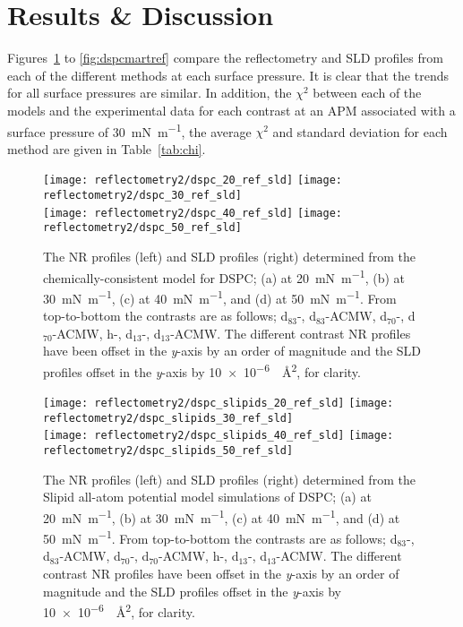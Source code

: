 \section{Results \& Discussion}
Figures~\ref{fig:dspcccref} to \ref{fig:dspcmartref} compare the reflectometry and SLD profiles from each of the different methods at each surface pressure.
It is clear that the trends for all surface pressures are similar.
In addition, the $\chi^2$ between each of the models and the experimental data for each contrast at an APM associated with a surface pressure of \SI{30}{\milli\newton\per\meter}, the average $\chi^2$ and standard deviation for each method are given in Table~\ref{tab:chi}.
%
\begin{figure}
    \centering
    \texttt{[image: reflectometry2/dspc\_20\_ref\_sld]}
    \texttt{[image: reflectometry2/dspc\_30\_ref\_sld]}\\
    \texttt{[image: reflectometry2/dspc\_40\_ref\_sld]}
    \texttt{[image: reflectometry2/dspc\_50\_ref\_sld]}
    \caption{The NR profiles (left) and SLD profiles (right) determined from the chemically-consistent model for DSPC; (a) at \SI{20}{\milli\newton\per\meter}, (b) at \SI{30}{\milli\newton\per\meter}, (c) at \SI{40}{\milli\newton\per\meter}, and (d) at \SI{50}{\milli\newton\per\meter}. From top-to-bottom the contrasts are as follows; d$_{83}$-, d$_{83}$-ACMW, d$_{70}$-, d$_{70}$-ACMW, h-, d$_{13}$-, d$_{13}$-ACMW. The different contrast NR profiles have been offset in the \emph{y}-axis by an order of magnitude and the SLD profiles offset in the \emph{y}-axis by \SI{10e-6}{\per\angstrom\squared}, for clarity.}
    \label{fig:dspcccref}
\end{figure}
%
%
\begin{figure}
    \centering
    \texttt{[image: reflectometry2/dspc\_slipids\_20\_ref\_sld]}
    \texttt{[image: reflectometry2/dspc\_slipids\_30\_ref\_sld]}\\
    \texttt{[image: reflectometry2/dspc\_slipids\_40\_ref\_sld]}
    \texttt{[image: reflectometry2/dspc\_slipids\_50\_ref\_sld]}
    \caption{The NR profiles (left) and SLD profiles (right) determined from the Slipid all-atom potential model simulations of DSPC; (a) at \SI{20}{\milli\newton\per\meter}, (b) at \SI{30}{\milli\newton\per\meter}, (c) at \SI{40}{\milli\newton\per\meter}, and (d) at \SI{50}{\milli\newton\per\meter}. From top-to-bottom the contrasts are as follows; d$_{83}$-, d$_{83}$-ACMW, d$_{70}$-, d$_{70}$-ACMW, h-, d$_{13}$-, d$_{13}$-ACMW. The different contrast NR profiles have been offset in the \emph{y}-axis by an order of magnitude and the SLD profiles offset in the \emph{y}-axis by \SI{10e-6}{\per\angstrom\squared}, for clarity.}
    \label{fig:dspcsliref}
\end{figure}
